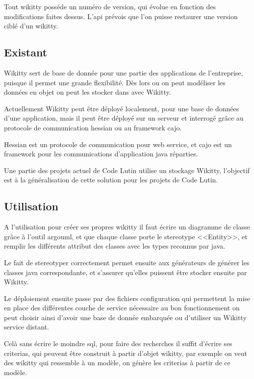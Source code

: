 Tout wikitty posséde un numéro de version, qui évolue en fonction des
modifications faites dessus. L'api prévois que l'on puisse restaurer une version
ciblé d'un wikitty.

\subsection{Existant}

Wikitty sert de base de donnée pour une partie des applications de l'entreprise,
puisque il permet une grande flexibilité. Dès lors ou on peut modéliser les
données en objet on peut les stocker dans avec Wikitty.

Actuellement Wikitty peut être déployé localement, pour une base de données
d'une application, mais il peut être déployé sur un serveur et interrogé grâce
au protocole de communication hessian ou au framework cajo.

Hessian est un protocole de communication pour web service, et cajo est un
framework pour les communications d'application java réparties. 

Une partie des projets actuel de Code Lutin utilise un stockage Wikitty, 
l'objectif est à la généralisation de cette solution pour les projets de 
Code Lutin.

\subsection{Utilisation}

A l'utilisation pour créer ses propres wikitty il faut écrire un diagramme de
classe grâce à l'outil argouml, et que chaque classe porte le stereotype
<<Entity>>, et remplir les différents attribut des classes avec les types
reconnus par java. 

Le fait de stereotyper correctement permet ensuite aux générateurs de générer
les classes java correspondante, et s'assurer qu'elles puissent être stocker
ensuite par Wikitty.

Le déploiement ensuite passe par des fichiers configuration qui permettent la
mise en place des différentes couche de service nécessaire au bon fonctionnement
on peut choisir ainsi d'avoir une base de donnée embarquée ou d'utiliser un
Wikitty service distant.

Celà sans écrire le moindre sql, pour faire des recherches il suffit d'écrire
ses criterias, qui peuvent être construit à partir d'objet wikitty, par exemple 
on veut des wikitty qui ressemble à un modèle, on génère les criterias à partir
de ce modèle.

